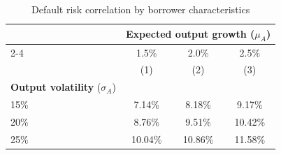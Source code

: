 \begin{table}[h]
\small
\centering
\caption{Default risk correlation by borrower characteristics}
\label{tab:table_corr_by_characteristics}
\begin{tabular*}{0.8\textwidth}{@{\extracolsep{\fill}}lccc}
\toprule
 & \multicolumn{3}{c}{\textbf{Expected output growth} ($\mu_A$)} \\
\cmidrule{2-4}
 & 1.5\% & 2.0\% & 2.5\% \\
 \addlinespace
 & (1) & (2) & (3) \\
\midrule
\textbf{Output volatility} ($\sigma_A$) & & & \\
\multicolumn{1}{l}{15\%} & 7.14\% & 8.18\% & 9.17\% \\
\multicolumn{1}{l}{20\%} & 8.76\% & 9.51\% & 10.42\% \\
\multicolumn{1}{l}{25\%} & 10.04\% & 10.86\% & 11.58\% \\
\bottomrule
\end{tabular*}
\end{table}
